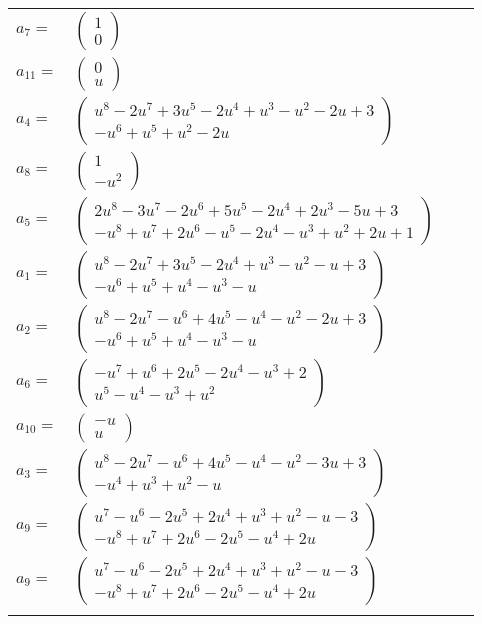 \documentclass[1p]{elsarticle_modified}
\theoremstyle{definition}
\begin{document}
\begin{tabular}{m{7pt} m{180pt} m{7pt} m{180pt} }
\flushright $a_{7}=$&$\begin{pmatrix}1\\0\end{pmatrix}$ \\
\flushright $a_{11}=$&$\begin{pmatrix}0\\u\end{pmatrix}$ \\
\flushright $a_{4}=$&$\begin{pmatrix}u^8-2 u^7+3 u^5-2 u^4+u^3- u^2-2 u+3\\- u^6+u^5+u^2-2 u\end{pmatrix}$ \\
\flushright $a_{8}=$&$\begin{pmatrix}1\\- u^2\end{pmatrix}$ \\
\flushright $a_{5}=$&$\begin{pmatrix}2 u^8-3 u^7-2 u^6+5 u^5-2 u^4+2 u^3-5 u+3\\- u^8+u^7+2 u^6- u^5-2 u^4- u^3+u^2+2 u+1\end{pmatrix}$ \\
\flushright $a_{1}=$&$\begin{pmatrix}u^8-2 u^7+3 u^5-2 u^4+u^3- u^2- u+3\\- u^6+u^5+u^4- u^3- u\end{pmatrix}$ \\
\flushright $a_{2}=$&$\begin{pmatrix}u^8-2 u^7- u^6+4 u^5- u^4- u^2-2 u+3\\- u^6+u^5+u^4- u^3- u\end{pmatrix}$ \\
\flushright $a_{6}=$&$\begin{pmatrix}- u^7+u^6+2 u^5-2 u^4- u^3+2\\u^5- u^4- u^3+u^2\end{pmatrix}$ \\
\flushright $a_{10}=$&$\begin{pmatrix}- u\\u\end{pmatrix}$ \\
\flushright $a_{3}=$&$\begin{pmatrix}u^8-2 u^7- u^6+4 u^5- u^4- u^2-3 u+3\\- u^4+u^3+u^2- u\end{pmatrix}$ \\
\flushright $a_{9}=$&$\begin{pmatrix}u^7- u^6-2 u^5+2 u^4+u^3+u^2- u-3\\- u^8+u^7+2 u^6-2 u^5- u^4+2 u\end{pmatrix}$\\ \flushright $a_{9}=$&$\begin{pmatrix}u^7- u^6-2 u^5+2 u^4+u^3+u^2- u-3\\- u^8+u^7+2 u^6-2 u^5- u^4+2 u\end{pmatrix}$\\&\end{tabular}
\end{document}
